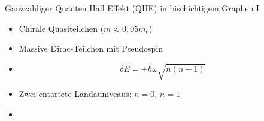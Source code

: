\documentclass[../defence.tex]{subfiles}
\begin{document}
  \begin{frame}{Ganzzahliger Quanten Hall Effekt (QHE) in bischichtigem Graphen I}
      \begin{itemize}
        \item Chirale Quasiteilchen ($m\approx 0,05 m_e$)
        \item Massive Dirac-Teilchen mit Pseudospin
        \item \begin{equation*}
                \delta E = \pm \hbar \omega \sqrt{n(n-1)}
              \end{equation*}
        \item Zwei entartete Landauniveaus: $n=0$, $n=1$
        \item 
      \end{itemize}
  \end{frame}
\end{document}

